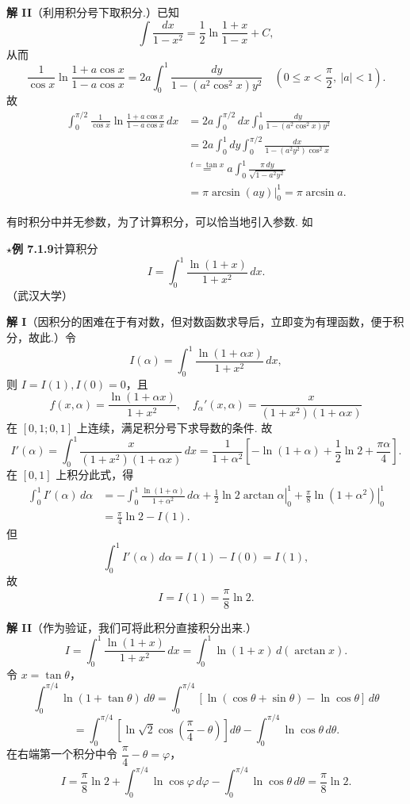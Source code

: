 \documentclass[UTF8,12pt,a4paper,fontset=fandol]{ctexart}
\begin{document}
\noindent\textbf{解 II}\quad （利用积分号下取积分.）已知
\[
\int\frac{dx}{1-x^2}=\frac12\ln\frac{1+x}{1-x}+C,
\]
从而
\[
\frac1{\cos x}\ln\frac{1+a\cos x}{1-a\cos x}
=2a\int_0^1\frac{dy}{1-(a^2\cos^2x)y^2}
\quad\left(0\le x<\frac\pi2,\ |a|<1\right).
\]
故
\[
\begin{aligned}
\int_0^{\pi/2}\frac1{\cos x}\ln\frac{1+a\cos x}{1-a\cos x}\,dx
&=2a\int_0^{\pi/2}dx\int_0^1\frac{dy}{1-(a^2\cos^2x)y^2}\\
&=2a\int_0^1dy\int_0^{\pi/2}\frac{dx}{1-(a^2y^2)\cos^2x}\\
&\stackrel{t=\tan x}{=}a\int_0^1\frac{\pi\,dy}{\sqrt{1-a^2y^2}}\\
&=\left.\pi\arcsin(ay)\right|_0^1=\pi\arcsin a.
\end{aligned}
\]

有时积分中并无参数，为了计算积分，可以恰当地引入参数. 如

\noindent\textbf{$\star$例 7.1.9}\quad 计算积分
\[
I=\int_0^1\frac{\ln(1+x)}{1+x^2}\,dx.
\]
（武汉大学）

\noindent\textbf{解 I}\quad （因积分的困难在于有对数，但对数函数求导后，立即变为有理函数，便于积分，故此.）令
\[
I(\alpha)=\int_0^1\frac{\ln(1+\alpha x)}{1+x^2}\,dx,
\]
则 $I=I(1), I(0)=0$，且
\[
f(x,\alpha)=\frac{\ln(1+\alpha x)}{1+x^2},\quad
f_\alpha'(x,\alpha)=\frac{x}{(1+x^2)(1+\alpha x)}
\]
在 $[0,1;0,1]$ 上连续，满足积分号下求导数的条件. 故
\[
I'(\alpha)=\int_0^1\frac{x}{(1+x^2)(1+\alpha x)}\,dx
=\frac1{1+\alpha^2}\left[-\ln(1+\alpha)+\frac12\ln2+\frac{\pi\alpha}{4}\right].
\]
在 $[0,1]$ 上积分此式，得
\[
\begin{aligned}
\int_0^1I'(\alpha)\,d\alpha
&=-\int_0^1\frac{\ln(1+\alpha)}{1+\alpha^2}\,d\alpha
+\left.\frac12\ln2\arctan\alpha\right|_0^1
+\left.\frac\pi8\ln(1+\alpha^2)\right|_0^1\\
&=\frac\pi4\ln2-I(1).
\end{aligned}
\]
但
\[
\int_0^1I'(\alpha)\,d\alpha=I(1)-I(0)=I(1),
\]
故
\[
I=I(1)=\frac\pi8\ln2.
\]

\noindent\textbf{解 II}\quad （作为验证，我们可将此积分直接积分出来.）
\[
I=\int_0^1\frac{\ln(1+x)}{1+x^2}\,dx
=\int_0^1\ln(1+x)\,d(\arctan x).
\]
令 $x=\tan\theta$，
\[
\int_0^{\pi/4}\ln(1+\tan\theta)\,d\theta
=\int_0^{\pi/4}[\ln(\cos\theta+\sin\theta)-\ln\cos\theta]\,d\theta
\]
\[
=\int_0^{\pi/4}\left[\ln\sqrt2\cos\left(\frac\pi4-\theta\right)\right]d\theta
-\int_0^{\pi/4}\ln\cos\theta\,d\theta.
\]
在右端第一个积分中令 $\dfrac\pi4-\theta=\varphi$，
\[
I=\frac\pi8\ln2+\int_0^{\pi/4}\ln\cos\varphi\,d\varphi
-\int_0^{\pi/4}\ln\cos\theta\,d\theta
=\frac\pi8\ln2.
\]
\end{document}
